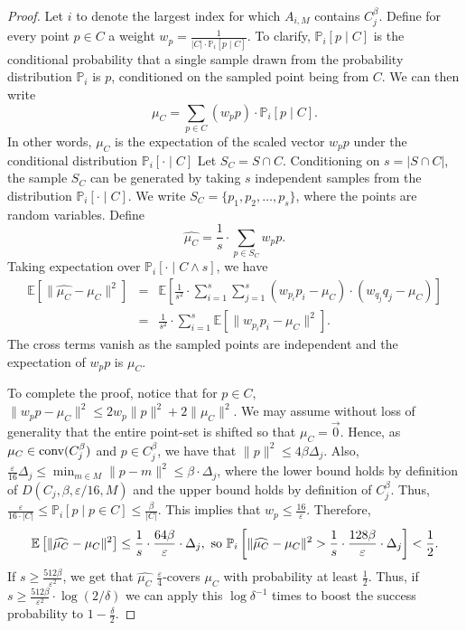 \documentclass[10pt,a4paper]{amsart}
\begin{document}
\begin{proof}
    Let $i$ to denote the largest index for which $A_{i,M}$ contains $C_j^\beta$.
    Define for every point $p\in C$ a weight $w_p = \frac{1}{|C|\cdot\mathbb{P}_i[p\mid C]}$. To clarify, $\mathbb{P}_i[p\mid C]$ 
    is the conditional probability that a single sample drawn from the probability distribution $\mathbb{P}_i$ is $p$, 
    conditioned on the sampled point being from $C$. We can then write
    $$
    \mu_C = \sum_{p\in C} (w_pp)\cdot\mathbb{P}_i[p\mid C].
    $$
    In other words, $\mu_C$ is the expectation of the scaled vector $w_pp$ under the conditional distribution $\mathbb{P}_i[\cdot\mid C]$
    Let $S_C = S\cap C$. Conditioning on $s = |S\cap C|$, the sample $S_C$ can be generated by taking $s$ independent samples from
    the distribution $\mathbb{P}_i[\cdot\mid C]$. We write $S_C = \{p_1,p_2,\dots,p_s\}$, where the points are random variables. Define
    $$
    \widehat{\mu_C} = \frac{1}{s}\cdot\sum_{p\in S_C} w_pp.
    $$
    Taking expectation over $\mathbb{P}_i[\cdot\mid C\wedge s]$, we have
    \begin{eqnarray*}
        {\mathbb E}\left[\|\widehat{\mu_C} - \mu_C\|^2\right] & = &
        {\mathbb E}\left[\frac{1}{s^2}\cdot\sum_{i=1}^s\sum_{j=1}^s (w_{p_i}p_i - \mu_C)\cdot (w_{q_j}q_j - \mu_C)\right] \\
        & = & \frac{1}{s^2}\cdot\sum_{i=1}^s {\mathbb E}\left[\|w_{p_i}p_i - \mu_C\|^2\right].
    \end{eqnarray*}
The cross terms vanish as the sampled points are independent and the expectation of $w_p p$ is $\mu_C$.

To complete the proof, notice that for $p\in C$, $\|w_{p}p - \mu_C\|^2\le 2w_p\|p\|^2 + 2\|\mu_C\|^2$. We may
assume without loss of generality that the entire point-set is shifted so that $\mu_C = \vec{0}$. Hence, as
$\mu_C\in \hbox{conv}(C_j^\beta)$ and $p\in C_j^\beta$, we have that $\|p\|^2\le 4\beta\Delta_j$. Also, 
$\frac{\varepsilon}{16}\Delta_j\leq \min_{m\in M} \|p-m\|^2 \leq \beta \cdot \Delta_j$, 
where the lower bound holds by definition of $D(C_j,\beta,\varepsilon/16,M)$ and the upper bound holds by 
definition of $C_j^\beta$. Thus, $\frac{\varepsilon}{16\cdot |C|}\leq \mathbb{P}_i[p\mid p\in C] \leq \frac{\beta}{|C|}$.
This implies that $w_p\le \frac{16}{\varepsilon}$. Therefore,
$$
{\mathbb E}\left[\|\widehat{\mu_C} - \mu_C\|^2\right] \le \frac{1}{s}\cdot\frac{64\beta}{\varepsilon}\cdot\Delta_j,
\hbox{ so  } \mathbb{P}_i\left[\|\widehat{\mu_C} - \mu_C\|^2 > \frac{1}{s}\cdot\frac{128\beta}{\varepsilon}\cdot\Delta_j\right] < \frac 1 2.
$$
If $s\ge \frac{512\beta}{\varepsilon^2}$, we get that $\widehat{\mu_C}$ $\frac{\varepsilon}{4}$-covers $\mu_C$ with probability
at least $\frac 1 2$. Thus, if $s\ge \frac{512\beta}{\varepsilon^2}\cdot\log(2/\delta)$ we can apply this $\log\delta^{-1}$
times to boost the success probability to $1-\frac{\delta}{2}$.


\end{proof}
\end{document}
